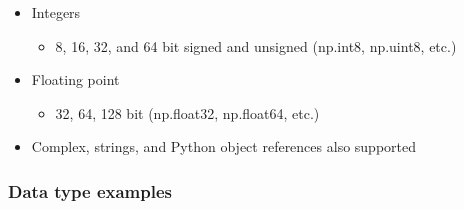 \documentclass[12pt,letterpaper,twoside]{article}
\begin{document}
\begin{itemize}
\item
  Integers

  \begin{itemize}
  
  \item
    8, 16, 32, and 64 bit signed and unsigned (np.int8, np.uint8, etc.)
  \end{itemize}
\item
  Floating point

  \begin{itemize}
  
  \item
    32, 64, 128 bit (np.float32, np.float64, etc.)
  \end{itemize}
\item
  Complex, strings, and Python object references also supported
\end{itemize}

\hypertarget{data-type-examples}{%
\subsubsection{Data type examples}\label{data-type-examples}}

\begin{python}
\begin{Highlighting}[]
\OperatorTok{=}\NormalTok{ np.array([ }\NormalTok{, }\NormalTok{, }\NormalTok{], dtype}\OperatorTok{=}
\end{Highlighting}
\end{python}

\begin{python}
\begin{Highlighting}[]
\NormalTok{a[}\NormalTok{] }\OperatorTok{=}\NormalTok{ a[}\NormalTok{]}\OperatorTok{/}
\end{Highlighting}
\end{python}

\begin{python}
\begin{Highlighting}[]
\OperatorTok{=}\NormalTok{ np.array([}\NormalTok{, }\NormalTok{, }\NormalTok{], dtype}\OperatorTok{=}
\end{Highlighting}
\end{python}
\end{document}
